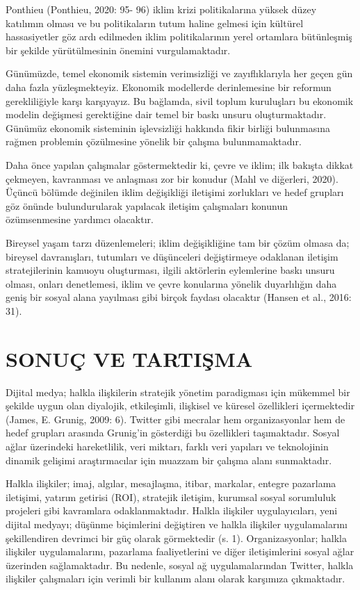 \documentclass[
]{book}
\begin{document}
Ponthieu (Ponthieu, 2020: 95- 96) iklim krizi politikalarına yüksek düzey katılımın olması ve bu politikaların tutum haline gelmesi için kültürel hassasiyetler göz ardı edilmeden iklim politikalarının yerel ortamlara bütünleşmiş bir şekilde yürütülmesinin önemini vurgulamaktadır.

Günümüzde, temel ekonomik sistemin verimsizliği ve zayıflıklarıyla her geçen gün daha fazla yüzleşmekteyiz. Ekonomik modellerde derinlemesine bir reformun gerekliliğiyle karşı karşıyayız. Bu bağlamda, sivil toplum kuruluşları bu ekonomik modelin değişmesi gerektiğine dair temel bir baskı unsuru oluşturmaktadır. Günümüz ekonomik sisteminin işlevsizliği hakkında fikir birliği bulunmasına rağmen problemin çözülmesine yönelik bir çalışma bulunmamaktadır.

Daha önce yapılan çalışmalar göstermektedir ki, çevre ve iklim; ilk bakışta dikkat çekmeyen, kavranması ve anlaşması zor bir konudur (Mahl ve diğerleri, 2020). Üçüncü bölümde değinilen iklim değişikliği iletişimi zorlukları ve hedef grupları göz önünde bulundurularak yapılacak iletişim çalışmaları konunun özümsenmesine yardımcı olacaktır.

Bireysel yaşam tarzı düzenlemeleri; iklim değişikliğine tam bir çözüm olmasa da; bireysel davranışları, tutumları ve düşünceleri değiştirmeye odaklanan iletişim stratejilerinin kamuoyu oluşturması, ilgili aktörlerin eylemlerine baskı unsuru olması, onları denetlemesi, iklim ve çevre konularına yönelik duyarlılığın daha geniş bir sosyal alana yayılması gibi birçok faydası olacaktır (Hansen et al., 2016: 31).

\hypertarget{sonuuxe7-ve-tartiux15fma}{%
\chapter*{SONUÇ VE TARTIŞMA}\label{sonuuxe7-ve-tartiux15fma}}

Dijital medya; halkla ilişkilerin stratejik yönetim paradigması için mükemmel bir şekilde uygun olan diyalojik, etkileşimli, ilişkisel ve küresel özellikleri içermektedir (James, E. Grunig, 2009: 6). Twitter gibi mecralar hem organizasyonlar hem de hedef grupları arasında Grunig'in gösterdiği bu özellikleri taşımaktadır. Sosyal ağlar üzerindeki hareketlilik, veri miktarı, farklı veri yapıları ve teknolojinin dinamik gelişimi araştırmacılar için muazzam bir çalışma alanı sunmaktadır.

Halkla ilişkiler; imaj, algılar, mesajlaşma, itibar, markalar, entegre pazarlama iletişimi, yatırım getirisi (ROI), stratejik iletişim, kurumsal sosyal sorumluluk projeleri gibi kavramlara odaklanmaktadır. Halkla ilişkiler uygulayıcıları, yeni dijital medyayı; düşünme biçimlerini değiştiren ve halkla ilişkiler uygulamalarını şekillendiren devrimci bir güç olarak görmektedir (s. 1). \citep{grunig2009paradigms} Organizasyonlar; halkla ilişkiler uygulamalarını, pazarlama faaliyetlerini ve diğer iletişimlerini sosyal ağlar üzerinden sağlamaktadır. Bu nedenle, sosyal ağ uygulamalarından Twitter, halkla ilişkiler çalışmaları için verimli bir kullanım alanı olarak karşımıza çıkmaktadır.
\end{document}
